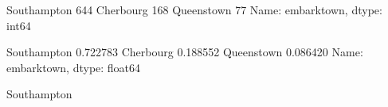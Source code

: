 \documentclass[letterpaper,10pt,english]{jupyterBook}
\begin{document}
\begin{sphinxVerbatim}[commandchars=\\\{\}]
Southampton    644
Cherbourg      168
Queenstown      77
Name: embark\PYGZus{}town, dtype: int64
\end{sphinxVerbatim}

\begin{sphinxVerbatim}[commandchars=\\\{\}]
\PYG{p}{[}\PYG{p}{]}
\end{sphinxVerbatim}

\begin{sphinxVerbatim}[commandchars=\\\{\}]
Southampton    0.722783
Cherbourg      0.188552
Queenstown     0.086420
Name: embark\PYGZus{}town, dtype: float64
\end{sphinxVerbatim}

\begin{sphinxVerbatim}[commandchars=\\\{\}]
 
\PYG{p}{[}\PYG{p}{]}
\end{sphinxVerbatim}

\begin{sphinxVerbatim}[commandchars=\\\{\}]
\PYGZsq{}Southampton\PYGZsq{}
\end{sphinxVerbatim}

\begin{sphinxVerbatim}[commandchars=\\\{\}]
\PYG{p}{[}\PYG{p}{]}
\end{sphinxVerbatim}
\end{document}
